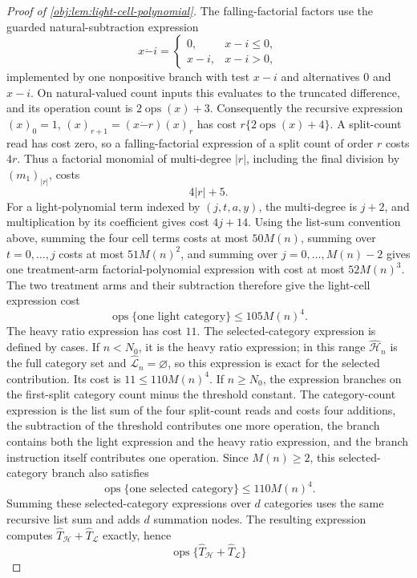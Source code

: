 \documentclass[11pt]{article}
\begin{document}
\begin{proof}[Proof of \cref{obj:lem:light-cell-polynomial}]
The falling-factorial factors use the guarded natural-subtraction expression
\[
x\mathbin{\dot{-}} i
=
\begin{cases}
0,&x-i\le0,\\
x-i,&x-i>0,
\end{cases}
\]
implemented by one nonpositive branch with test \(x-i\) and alternatives \(0\) and \(x-i\).  On natural-valued count inputs this evaluates to the truncated difference, and its operation count is \(2\operatorname{ops}(x)+3\).  Consequently the recursive expression
\((x)_0=1\), \((x)_{r+1}=(x\mathbin{\dot{-}} r)(x)_r\) has cost \(r\{2\operatorname{ops}(x)+4\}\).  A split-count read has cost zero, so a falling-factorial expression of a split count of order \(r\) costs \(4r\).  Thus a factorial monomial of multi-degree \(|r|\), including the final division by \((m_1)_{|r|}\), costs
\[
4|r|+5 .
\]
For a light-polynomial term indexed by \((j,t,a,y)\), the multi-degree is \(j+2\), and multiplication by its coefficient gives cost \(4j+14\).  Using the list-sum convention above, summing the four cell terms costs at most \(50M(n)\), summing over \(t=0,\ldots,j\) costs at most \(51M(n)^2\), and summing over \(j=0,\ldots,M(n)-2\) gives one treatment-arm factorial-polynomial expression with cost at most \(52M(n)^3\).  The two treatment arms and their subtraction therefore give the light-cell expression cost
\[
\operatorname{ops}\{\text{one light category}\}
\le 105M(n)^4 .
\]
The heavy ratio expression has cost \(11\).  The selected-category expression is defined by cases.  If \(n<N_0\), it is the heavy ratio expression; in this range \(\widehat{\mathcal H}_n\) is the full category set and \(\widehat{\mathcal L}_n=\varnothing\), so this expression is exact for the selected contribution.  Its cost is \(11\le110M(n)^4\).  If \(n\ge N_0\), the expression branches on the first-split category count minus the threshold constant.  The category-count expression is the list sum of the four split-count reads and costs four additions, the subtraction of the threshold contributes one more operation, the branch contains both the light expression and the heavy ratio expression, and the branch instruction itself contributes one operation.  Since \(M(n)\ge2\), this selected-category branch also satisfies
\[
\operatorname{ops}\{\text{one selected category}\}
\le 110M(n)^4 .
\]
Summing these selected-category expressions over \(d\) categories uses the same recursive list sum and adds \(d\) summation nodes.  The resulting expression computes \(\widehat T_{\mathcal H}+\widehat T_{\mathcal L}\) exactly, hence
\[
\operatorname{ops}\{\widehat T_{\mathcal H}+\widehat T_{\mathcal L}\}
\]
\end{proof}
\end{document}
